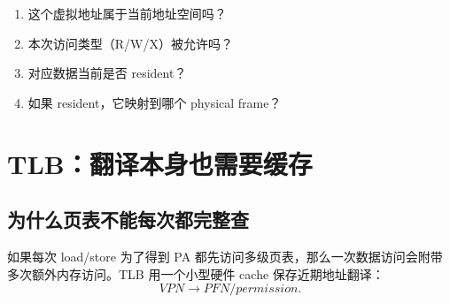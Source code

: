 \documentclass[11pt,a4paper]{ctexart}
\begin{document}
\begin{exam}[一次访存必须依次回答四个问题]
\begin{enumerate}
  \item 这个虚拟地址属于当前地址空间吗？
  \item 本次访问类型（R/W/X）被允许吗？
  \item 对应数据当前是否 resident？
  \item 如果 resident，它映射到哪个 physical frame？
\end{enumerate}
\end{exam}

\section{TLB：翻译本身也需要缓存}

\subsection{为什么页表不能每次都完整查}
如果每次 load/store 为了得到 PA 都先访问多级页表，那么一次数据访问会附带多次额外内存访问。TLB 用一个小型硬件 cache 保存近期地址翻译：
\[
VPN\to PFN/permission.
\]
\end{document}
